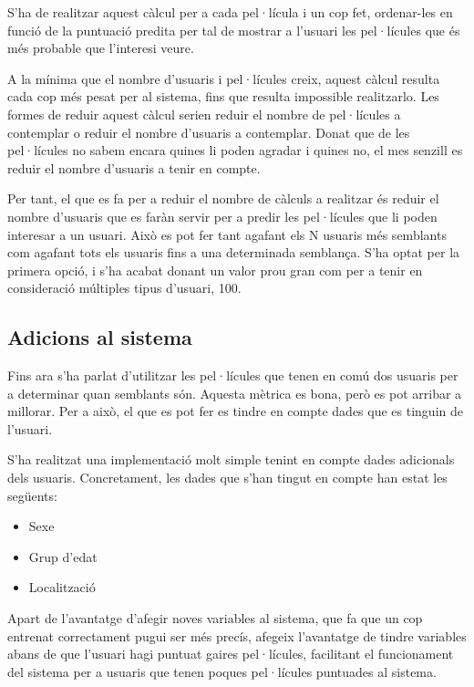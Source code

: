 S'ha de realitzar aquest càlcul per a cada pel·lícula i un cop fet, ordenar-les en funció de la puntuació predita per tal de mostrar a l'usuari les pel·lícules que és més probable que l'interesi veure.

A la mínima que el nombre d'usuaris i pel·lícules creix, aquest càlcul resulta cada cop més pesat per al sistema, fins que resulta impossible realitzarlo. Les formes de reduir aquest càlcul serien reduir el nombre de pel·lícules a contemplar o reduir el nombre d'usuaris a contemplar. Donat que de les pel·lícules no sabem encara quines li poden agradar i quines no, el mes senzill es reduir el nombre d'usuaris a tenir en compte.

Per tant, el que es fa per a reduir el nombre de càlculs a realitzar és reduir el nombre d'usuaris que es faràn servir per a predir les pel·lícules que li poden interesar a un usuari. Això es pot fer tant agafant els N usuaris més semblants com agafant tots els usuaris fins a una determinada semblança. S'ha optat per la primera opció, i s'ha acabat donant un valor prou gran com per a tenir en consideració múltiples tipus d'usuari, 100.

\subsection{Adicions al sistema}

Fins ara s'ha parlat d'utilitzar les pel·lícules que tenen en comú dos usuaris per a determinar quan semblants són. Aquesta mètrica es bona, però es pot arribar a millorar. Per a això, el que es pot fer es tindre en compte dades que es tinguin de l'usuari.

S'ha realitzat una implementació molt simple tenint en compte dades adicionals dels usuaris. Concretament, les dades que s'han tingut en compte han estat les següents:

\begin{itemize}
	\item Sexe
	\item Grup d'edat
	\item Localització
\end{itemize}

Apart de l'avantatge d'afegir noves variables al sistema, que fa que un cop entrenat correctament pugui ser més precís, afegeix l'avantatge de tindre variables abans de que l'usuari hagi puntuat gaires pel·lícules, facilitant el funcionament del sistema per a usuaris que tenen poques pel·lícules puntuades al sistema.

